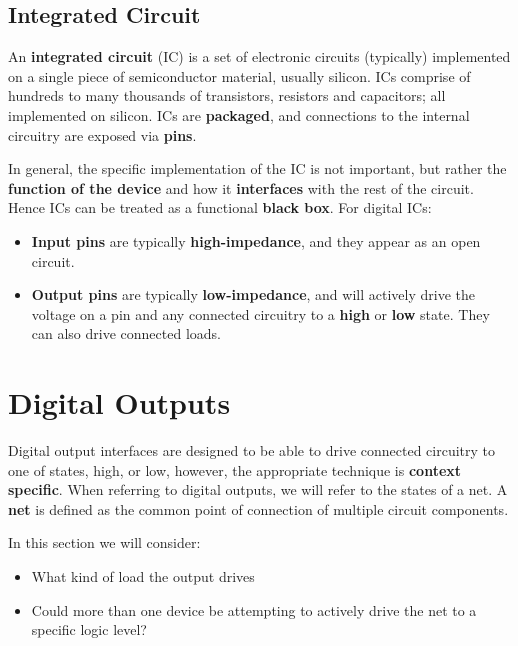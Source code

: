 \documentclass[a4paper]{report}
\begin{document}
\subsection{Integrated Circuit}
An \textbf{integrated circuit} (IC) is a set of electronic circuits (typically) implemented on a
single piece of semiconductor material, usually silicon. ICs comprise of hundreds to
many thousands of transistors, resistors and capacitors; all implemented on silicon.
ICs are \textbf{packaged}, and connections to the internal circuitry are exposed via \textbf{pins}.

In general, the specific implementation of the IC is not important, but
rather the \textbf{function of the device} and how it \textbf{interfaces} with the rest of the circuit.
Hence ICs can be treated as a functional \textbf{black box}.
For digital ICs:
\begin{itemize}
    \item \textbf{Input pins} are typically \textbf{high-impedance}, and they appear as an open circuit.
    \item \textbf{Output pins} are typically \textbf{low-impedance}, and will actively drive the voltage
          on a pin and any connected circuitry to a \textbf{high} or \textbf{low} state. They can also
          drive connected loads.
\end{itemize}
\section{Digital Outputs}
Digital output interfaces are designed to be able to drive connected circuitry to one of states,
high, or low, however, the appropriate technique is \textbf{context specific}.
When referring to digital outputs, we will refer to the states of a net. A \textbf{net}
is defined as the common point of connection of multiple circuit components.

In this section we will consider:
\begin{itemize}
    \item What kind of load the output drives
    \item Could more than one device be attempting to actively drive the net
          to a specific logic level?
\end{itemize}
\end{document}
